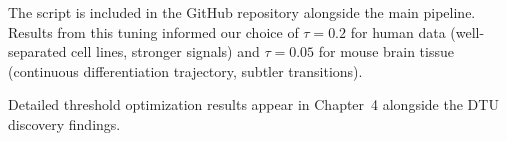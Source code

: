 The script is included in the GitHub repository alongside the main pipeline. Results from this tuning informed our choice of $\tau = 0.2$ for human data (well-separated cell lines, stronger signals) and $\tau = 0.05$ for mouse brain tissue (continuous differentiation trajectory, subtler transitions).

Detailed threshold optimization results appear in Chapter~4 alongside the DTU discovery findings.